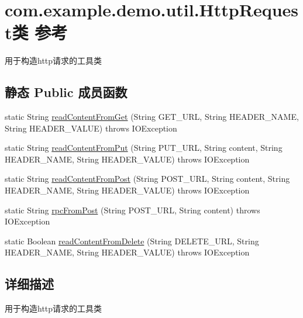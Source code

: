 \hypertarget{classcom_1_1example_1_1demo_1_1util_1_1_http_request}{}\section{com.\+example.\+demo.\+util.\+Http\+Request类 参考}
\label{classcom_1_1example_1_1demo_1_1util_1_1_http_request}


用于构造http请求的工具类  


\subsection*{静态 Public 成员函数}
\begin{DoxyCompactItemize}
\item 
static String \mbox{\hyperlink{classcom_1_1example_1_1demo_1_1util_1_1_http_request_a009e94fa5d7d4e49951fb2dc927e9396}{read\+Content\+From\+Get}} (String G\+E\+T\+\_\+\+U\+RL, String H\+E\+A\+D\+E\+R\+\_\+\+N\+A\+ME, String H\+E\+A\+D\+E\+R\+\_\+\+V\+A\+L\+UE)  throws I\+O\+Exception 
\item 
static String \mbox{\hyperlink{classcom_1_1example_1_1demo_1_1util_1_1_http_request_ad33e1a2a80ef4ab0ea776de1790ec6e1}{read\+Content\+From\+Put}} (String P\+U\+T\+\_\+\+U\+RL, String content, String H\+E\+A\+D\+E\+R\+\_\+\+N\+A\+ME, String H\+E\+A\+D\+E\+R\+\_\+\+V\+A\+L\+UE)  throws I\+O\+Exception 
\item 
static String \mbox{\hyperlink{classcom_1_1example_1_1demo_1_1util_1_1_http_request_ada323a0ecc83eee413ab8fa9b8e983f3}{read\+Content\+From\+Post}} (String P\+O\+S\+T\+\_\+\+U\+RL, String content, String H\+E\+A\+D\+E\+R\+\_\+\+N\+A\+ME, String H\+E\+A\+D\+E\+R\+\_\+\+V\+A\+L\+UE)  throws I\+O\+Exception 
\item 
static String \mbox{\hyperlink{classcom_1_1example_1_1demo_1_1util_1_1_http_request_a15430f22e99a4b934e71c3cd8c348b8e}{rpc\+From\+Post}} (String P\+O\+S\+T\+\_\+\+U\+RL, String content)  throws I\+O\+Exception 
\item 
static Boolean \mbox{\hyperlink{classcom_1_1example_1_1demo_1_1util_1_1_http_request_aaabfb0dece2bb297e00640a7d7c764df}{read\+Content\+From\+Delete}} (String D\+E\+L\+E\+T\+E\+\_\+\+U\+RL, String H\+E\+A\+D\+E\+R\+\_\+\+N\+A\+ME, String H\+E\+A\+D\+E\+R\+\_\+\+V\+A\+L\+UE)  throws I\+O\+Exception 
\end{DoxyCompactItemize}


\subsection{详细描述}
用于构造http请求的工具类 

